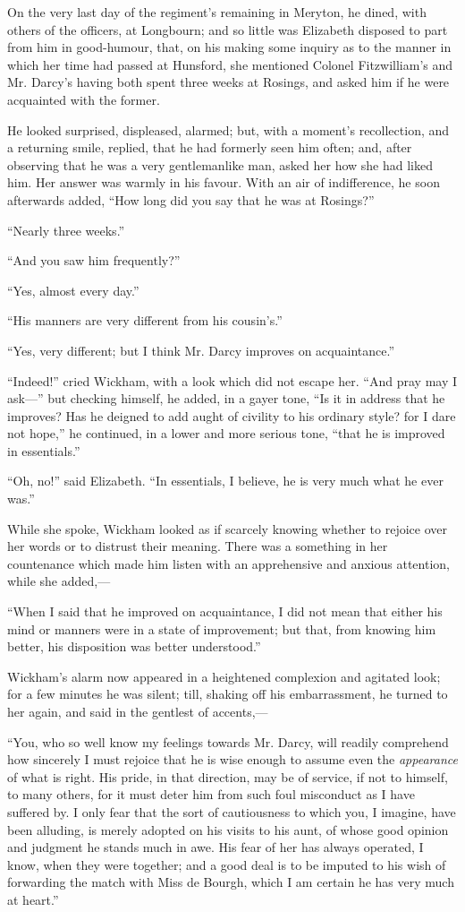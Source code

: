\documentclass[12pt,openright]{book}
\begin{document}
On the very last day of the regiment’s remaining in Meryton, he dined, with others of the officers, at Longbourn; and so little was Elizabeth disposed to part from him in good-humour, that, on his making some inquiry as to the manner in which her time had passed at Hunsford, she mentioned Colonel Fitzwilliam’s and Mr. Darcy’s having both spent three weeks at Rosings, and asked him if he were acquainted with the former.

He looked surprised, displeased, alarmed; but, with a moment’s recollection, and a returning smile, replied, that he had formerly seen him often; and, after observing that he was a very gentlemanlike man, asked her how she had liked him. Her answer was warmly in his favour. With an air of indifference, he soon afterwards added, “How long did you say that he was at Rosings?”

“Nearly three weeks.”

“And you saw him frequently?”

“Yes, almost every day.”

“His manners are very different from his cousin’s.”

“Yes, very different; but I think Mr. Darcy improves on acquaintance.”

“Indeed!” cried Wickham, with a look which did not escape her. “And pray may I ask—” but checking himself, he added, in a gayer tone, “Is it in address that he improves? Has he deigned to add aught of civility to his ordinary style? for I dare not hope,” he continued, in a lower and more serious tone, “that he is improved in essentials.”

“Oh, no!” said Elizabeth. “In essentials, I believe, he is very much what he ever was.”

While she spoke, Wickham looked as if scarcely knowing whether to rejoice over her words or to distrust their meaning. There was a something in her countenance which made him listen with an apprehensive and anxious attention, while she added,—

“When I said that he improved on acquaintance, I did not mean that either his mind or manners were in a state of improvement; but that, from knowing him better, his disposition was better understood.”

Wickham’s alarm now appeared in a heightened complexion and agitated look; for a few minutes he was silent; till, shaking off his embarrassment, he turned to her again, and said in the gentlest of accents,—

“You, who so well know my feelings towards Mr. Darcy, will readily comprehend how sincerely I must rejoice that he is wise enough to assume even the \textit{appearance} of what is right. His pride, in that direction, may be of service, if not to himself, to many others, for it must deter him from such foul misconduct as I have suffered by. I only fear that the sort of cautiousness to which you, I imagine, have been alluding, is merely adopted on his visits to his aunt, of whose good opinion and judgment he stands much in awe. His fear of her has always operated, I know, when they were together; and a good deal is to be imputed to his wish of forwarding the match with Miss de Bourgh, which I am certain he has very much at heart.”
\end{document}
